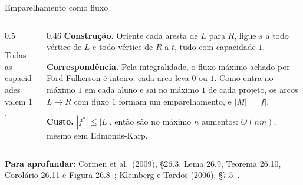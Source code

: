 \documentclass[aspectratio=169,xcolor=table]{beamer}
\newcommand{\arestasbip}{A/p1, A/p2, B/p1, C/p2, C/p3, D/p3, D/p4}
\newcommand{\nosbip}{%
  \node[vert] (A) at (0,1.2)  {A};  \node[vert] (B) at (0,0.4)  {B};
  \node[vert] (C) at (0,-0.4) {C};  \node[vert] (D) at (0,-1.2) {D};
  \node[vert] (p1) at (2,1.2)  {1}; \node[vert] (p2) at (2,0.4)  {2};
  \node[vert] (p3) at (2,-0.4) {3}; \node[vert] (p4) at (2,-1.2) {4};
}
\newcommand{\fonte}[1]{%
  \vfill
  {\tiny\color{gray!55!black}\textbf{Para aprofundar:} #1\par}%
}
\begin{document}
\begin{frame}{Emparelhamento como fluxo}
  \begin{columns}[c]
    \begin{column}{0.5\textwidth}
      \begin{center}
      \end{center}
      {\scriptsize Todas as capacidades valem $1$.\par}
    \end{column}
    \begin{column}{0.46\textwidth}
      \scriptsize
      \textbf{Construção.} Oriente cada aresta de $L$ para $R$, ligue $s$ a todo vértice de
      $L$ e todo vértice de $R$ a $t$, tudo com capacidade $1$.
      \medskip

      \textbf{Correspondência.} Pela integralidade, o fluxo máximo achado por Ford-Fulkerson
      é inteiro: cada arco leva $0$ ou $1$. Como entra no máximo $1$ em cada aluno e sai no
      máximo $1$ de cada projeto, os arcos $L \to R$ com fluxo $1$ formam um emparelhamento,
      e $|M| = |f|$.
      \medskip

      \textbf{Custo.} $|f^*| \le |L|$, então são no máximo $n$ aumentos: $O(nm)$, mesmo sem
      Edmonds-Karp.
    \end{column}
  \end{columns}
  \fonte{Cormen et al.\ (2009), \S 26.3, Lema 26.9, Teorema 26.10, Corolário 26.11 e
    Figura 26.8~\cite{cormen2009introduction}; Kleinberg e Tardos (2006), \S 7.5~\cite{kleinberg2006algorithm}.}
\end{frame}
\end{document}
